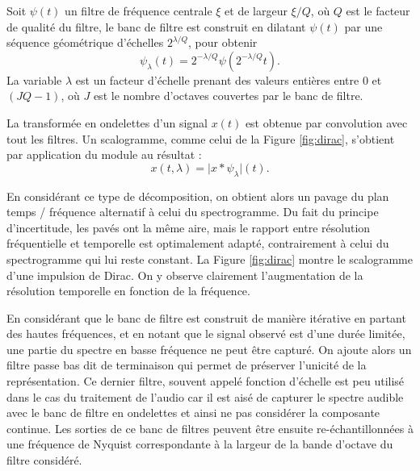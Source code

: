 
Soit ${\psi}(t)$ un filtre de fréquence centrale $\xi$ et de largeur $\xi/Q$, où $Q$ est le facteur de qualité du filtre, le banc de filtre est construit en dilatant
 ${\psi}(t)$ par une séquence géométrique d'échelles $2^{\lambda/Q}$, pour obtenir
\begin{equation}
{\psi_{\lambda}}(t) = 2^{-\lambda/Q} {\psi}(2^{-\lambda/Q} t)\mbox{.}
\end{equation}
La variable $\lambda$ est un facteur d'échelle prenant des valeurs entières entre $0$ et $(J Q - 1)$, où $J$ est le nombre d'octaves couvertes par le banc de filtre.

La transformée en ondelettes d'un signal
${x}(t)$ est obtenue par convolution avec tout les filtres. Un scalogramme, comme celui de la Figure \ref{fig:dirac}, s'obtient par application du module au résultat :
\begin{equation}
{x}(t, \lambda)
= \vert {x} \ast {\psi_{\lambda}} \vert (t)\mbox{.}
\end{equation}


En considérant ce type de décomposition, on obtient alors un pavage du plan temps / fréquence alternatif à celui du spectrogramme. Du fait du principe d'incertitude, les pavés ont la même aire, mais le rapport entre résolution fréquentielle et temporelle est optimalement adapté, contrairement à celui du spectrogramme qui lui reste constant. La Figure \ref{fig:dirac} montre le scalogramme d'une impulsion de Dirac. On y observe clairement l'augmentation de la résolution temporelle en fonction de la fréquence.

En considérant que le banc de filtre est construit de manière itérative en partant des hautes fréquences, et en notant que le signal observé est d'une durée limitée, une partie du spectre en basse fréquence ne peut être capturé. On ajoute alors un filtre passe bas dit \og de terminaison \fg qui permet de préserver l'unicité de la représentation. Ce dernier filtre, souvent appelé \og fonction d'échelle \fg est peu utilisé dans le cas du traitement de l'audio car il est aisé de capturer le spectre audible avec le banc de filtre en ondelettes et ainsi ne pas considérer la composante continue. Les sorties de ce banc de filtres peuvent être ensuite re-échantillonnées à une fréquence de Nyquist correspondante à la largeur de la bande d'octave du filtre considéré.

